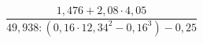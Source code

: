 \begin{ex}[type=calculate]
	\begin{condition}
		\( \dfrac{1,476+2,08\cdot4,05}{49,938:(0,16\cdot12,34^2-0,16^3)-0,25} \)
	\end{condition}
\end{ex}